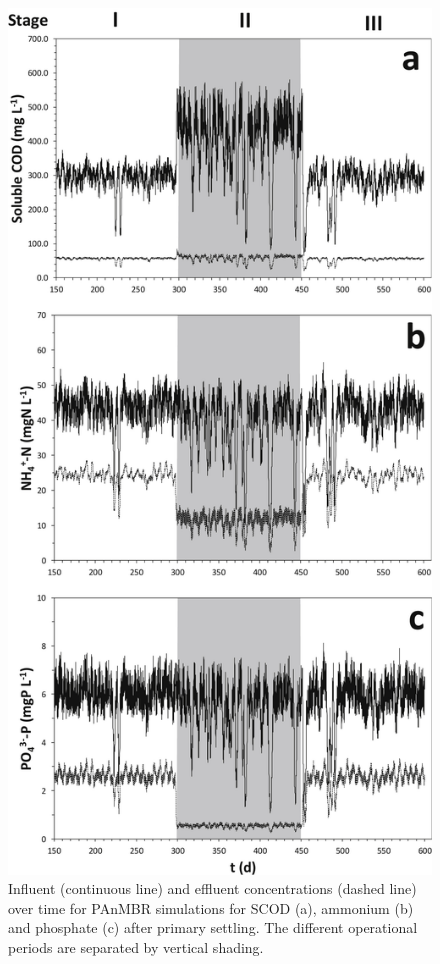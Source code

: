 \begin{figure}[tp]
    \centering
    \includegraphics[width=1\linewidth,height=0.9\textheight,keepaspectratio]{./Chap2/simulations/dynamic_output.jpg}
    \caption{Influent (continuous line) and effluent concentrations (dashed line) over time for PAnMBR simulations for SCOD (a), ammonium (b) and phosphate (c) after primary settling. The different operational periods are separated by vertical shading.}
    \label{fig:ch2_dyn_sol}
\end{figure}

